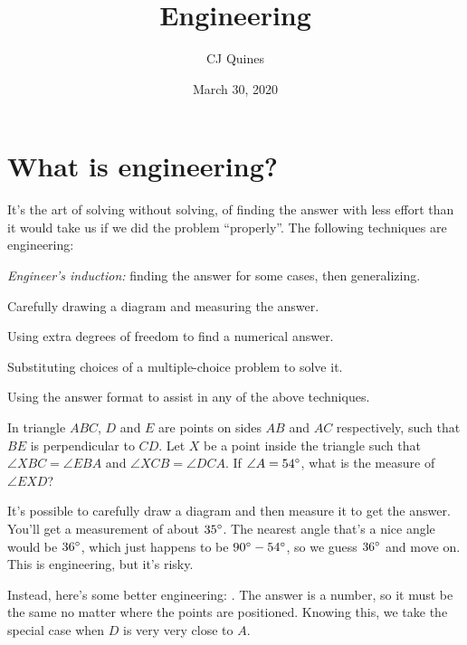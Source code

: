 \documentclass[11pt,paper=letter]{scrartcl}
\begin{document}
\title{Engineering}
\author{CJ Quines}
\date{March 30, 2020}

\maketitle

\section{What is engineering?}

 It's the art of solving without solving, of finding the answer with less effort than it would take us if we did the problem ``properly''. The following techniques are engineering:

\begin{itemthin}
  \item \emph{Engineer's induction:} finding the answer for some cases, then generalizing.
  \item Carefully drawing a diagram and measuring the answer.
  \item Using extra degrees of freedom to find a numerical answer.
  \item Substituting choices of a multiple-choice problem to solve it.
  \item Using the answer format to assist in any of the above techniques.
\end{itemthin}
\vspace{-12pt}

\begin{exboxed}
In triangle $ABC$, $D$ and $E$ are points on sides $AB$ and $AC$ respectively, such that $BE$ is perpendicular to $CD$. Let $X$ be a point inside the triangle such that $\angle XBC = \angle EBA$ and $\angle XCB = \angle DCA$. If $\angle A = 54^\circ$, what is the measure of $\angle EXD$?
\end{exboxed}

It's possible to carefully draw a diagram and then measure it to get the answer. You'll get a measurement of about $35^\circ$. The nearest angle that's a nice angle would be $36^\circ$, which just happens to be $90^\circ - 54^\circ$, so we guess $36^\circ$ and move on. This is engineering, but it's risky.

Instead, here's some better engineering: . The answer is a number, so it must be the same no matter where the points are positioned. Knowing this, we take the special case when $D$ is very very close to $A$.
\end{document}

